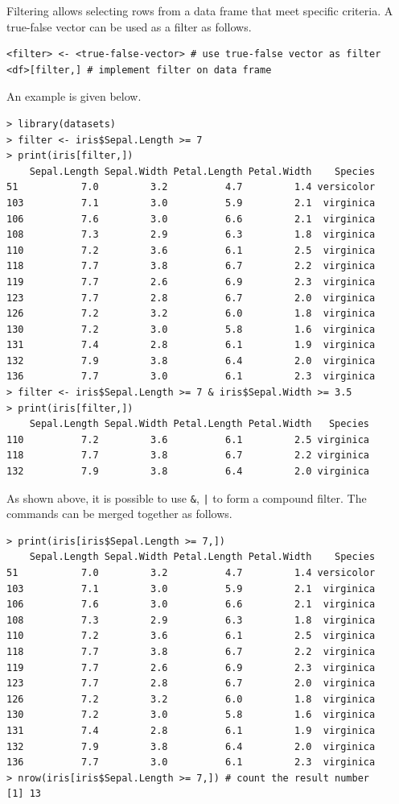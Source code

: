 Filtering allows selecting rows from a data frame that meet specific criteria. A true-false vector can be used as a filter as follows.
\begin{lstlisting}
<filter> <- <true-false-vector> # use true-false vector as filter
<df>[filter,] # implement filter on data frame
\end{lstlisting}
An example is given below.
\begin{lstlisting}
> library(datasets)
> filter <- iris$Sepal.Length >= 7
> print(iris[filter,])
    Sepal.Length Sepal.Width Petal.Length Petal.Width    Species
51           7.0         3.2          4.7         1.4 versicolor
103          7.1         3.0          5.9         2.1  virginica
106          7.6         3.0          6.6         2.1  virginica
108          7.3         2.9          6.3         1.8  virginica
110          7.2         3.6          6.1         2.5  virginica
118          7.7         3.8          6.7         2.2  virginica
119          7.7         2.6          6.9         2.3  virginica
123          7.7         2.8          6.7         2.0  virginica
126          7.2         3.2          6.0         1.8  virginica
130          7.2         3.0          5.8         1.6  virginica
131          7.4         2.8          6.1         1.9  virginica
132          7.9         3.8          6.4         2.0  virginica
136          7.7         3.0          6.1         2.3  virginica
> filter <- iris$Sepal.Length >= 7 & iris$Sepal.Width >= 3.5
> print(iris[filter,])
    Sepal.Length Sepal.Width Petal.Length Petal.Width   Species
110          7.2         3.6          6.1         2.5 virginica
118          7.7         3.8          6.7         2.2 virginica
132          7.9         3.8          6.4         2.0 virginica
\end{lstlisting}
As shown above, it is possible to use \verb|&|, \verb$|$ to form a compound filter. The commands can be merged together as follows.
\begin{lstlisting}
> print(iris[iris$Sepal.Length >= 7,])
    Sepal.Length Sepal.Width Petal.Length Petal.Width    Species
51           7.0         3.2          4.7         1.4 versicolor
103          7.1         3.0          5.9         2.1  virginica
106          7.6         3.0          6.6         2.1  virginica
108          7.3         2.9          6.3         1.8  virginica
110          7.2         3.6          6.1         2.5  virginica
118          7.7         3.8          6.7         2.2  virginica
119          7.7         2.6          6.9         2.3  virginica
123          7.7         2.8          6.7         2.0  virginica
126          7.2         3.2          6.0         1.8  virginica
130          7.2         3.0          5.8         1.6  virginica
131          7.4         2.8          6.1         1.9  virginica
132          7.9         3.8          6.4         2.0  virginica
136          7.7         3.0          6.1         2.3  virginica
> nrow(iris[iris$Sepal.Length >= 7,]) # count the result number
[1] 13
\end{lstlisting}

